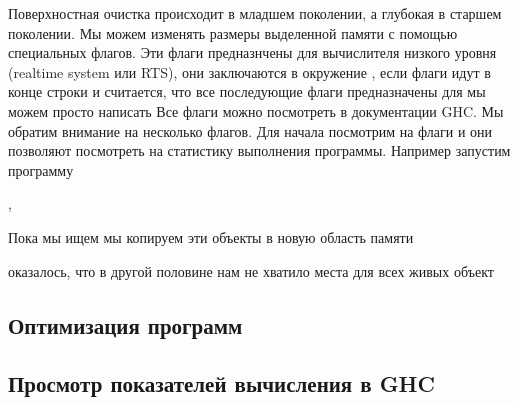 Поверхностная очистка происходит в младшем поколении, а
глубокая в старшем поколении. Мы можем изменять размеры
выделенной памяти с помощью специальных флагов. 
Эти флаги предназнчены для вычислителя низкого уровня
(realtime system или RTS), они заключаются в окружение 
, если флаги идут в конце строки и считается,
что все последующие флаги предназначены для 
мы можем просто написать 
Все флаги можно посмотреть в документации GHC. Мы обратим
внимание на несколько флагов. Для начала посмотрим на
флаги  и  они позволяют посмотреть
на статистику выполнения программы. Например запустим программу
    
\begin{code}

\end{code}



,



Пока мы ищем мы копируем эти объекты в новую область памяти

оказалось, что 
в другой половине нам не хватило места для всех живых объект


\begin{code}
\end{code}

\begin{code}
\end{code}

\begin{code}
\end{code}

\begin{code}
\end{code}


\subsection{Оптимизация программ}

\subsection{Просмотр показателей вычисления в GHC}
\begin{code}
\end{code}

\begin{code}
\end{code}


